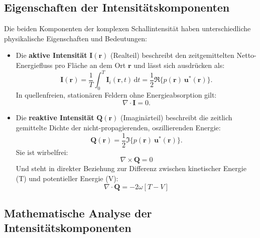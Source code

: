 \subsection{Eigenschaften der Intensitätskomponenten
\label{helmholtz:subsection:def_Schallintensitaet}}

Die beiden Komponenten der komplexen Schallintensität haben unterschiedliche physikalische Eigenschaften und Bedeutungen:

\begin{itemize}
\item Die \textbf{aktive Intensität} $\boldsymbol{I}(\boldsymbol{r})$ (Realteil) beschreibt den zeitgemittelten Netto-Energiefluss pro Fläche an dem Ort $\boldsymbol{r}$ und lässt sich ausdrücken als:
\begin{equation}
\boldsymbol{I}(\boldsymbol{r}) = \frac{1}{T}\int_0^T \boldsymbol{I}_i(\boldsymbol{r},t)\,\mathrm{d}t = \frac{1}{2}\Re\{p(\boldsymbol{r})~\boldsymbol{u}^*(\boldsymbol{r})\}.
\end{equation}
In quellenfreien, stationären Feldern ohne Energieabsorption gilt:
\begin{equation}
\nabla \cdot \boldsymbol{I} = 0.
\end{equation}

\item Die \textbf{reaktive Intensität} $\boldsymbol{Q}(\boldsymbol{r})$ (Imaginärteil) beschreibt die zeitlich gemittelte Dichte der nicht-propagierenden, oszillierenden Energie: 
\begin{equation}
\boldsymbol{Q}(\boldsymbol{r}) = \frac{1}{2}\Im\{p(\boldsymbol{r})~\boldsymbol{u}^*(\boldsymbol{r})\}.
\label{helmholtz:equationReaktiveIntensitaet}
\end{equation}
Sie ist wirbelfrei:
\begin{equation}
\nabla \times \boldsymbol{Q} = 0
\end{equation}
Und steht in direkter Beziehung zur Differenz zwischen kinetischer Energie (T) und potentieller Energie (V):
\begin{equation}
\nabla \cdot \boldsymbol{Q} = -2 \omega [T-V]
\end{equation}
\end{itemize}


\subsection{Mathematische Analyse der Intensitätskomponenten
\label{helmholtz:subsection:def_Schallintensitaet}}

